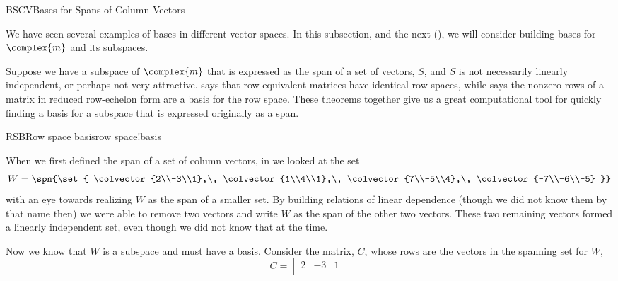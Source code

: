 \begin{subsect}{BSCV}{Bases for Spans of Column Vectors}
%
\begin{para}We have seen several examples of bases in different vector spaces.  In this subsection, and the next (), we will consider building bases for $\complex{m}$ and its subspaces.\end{para}
%
\begin{para}Suppose we have a subspace of $\complex{m}$ that is expressed as the span of a set of vectors, $S$, and $S$ is not necessarily linearly independent, or perhaps not very attractive.   says that row-equivalent matrices have identical row spaces, while  says the nonzero rows of a matrix in reduced row-echelon form are a basis for the row space.  These theorems together give us a great computational tool for quickly finding a basis for a subspace that is expressed originally as a span.\end{para}
%
\begin{example}{RSB}{Row space basis}{row space!basis}
\begin{para}When we first defined the span of a set of column vectors, in  we looked at the set
%
\begin{equation*}
W=\spn{\set{
\colvector{2\\-3\\1},\,
\colvector{1\\4\\1},\,
\colvector{7\\-5\\4},\,
\colvector{-7\\-6\\-5}
}}
\end{equation*}
%
with an eye towards realizing $W$ as the span of a smaller set.  By building relations of linear dependence (though we did not know them by that name then) we were able to remove two vectors and write $W$ as the span of the other two vectors.  These two remaining vectors formed a linearly independent set, even though we did not know that at the time.\end{para}
%
\begin{para}Now we know that $W$ is a subspace and must have a basis.  Consider the matrix, $C$, whose rows are the vectors in the spanning set for $W$,
%
\begin{equation*}
C=\begin{bmatrix}
2 & -3 & 1\\

\end{bmatrix}
\end{equation*}
\end{para}
\end{example}
\end{subsect}

